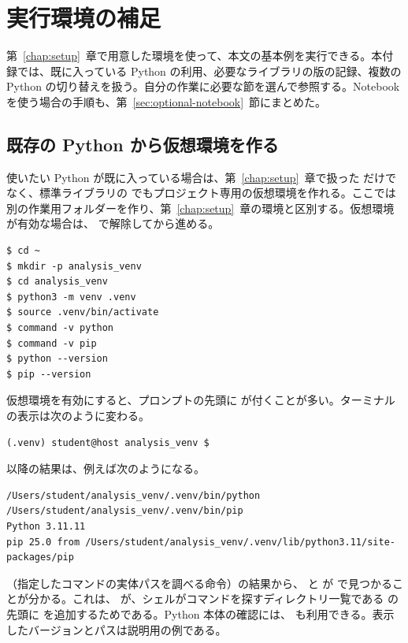 \chapter{実行環境の補足}
\label{app:environment}

第~\ref{chap:setup}~章で用意した環境を使って、本文の基本例を実行できる。本付録では、既に入っている Python の利用、必要なライブラリの版の記録、複数の Python の切り替えを扱う。自分の作業に必要な節を選んで参照する。Notebook を使う場合の手順も、第~\ref{sec:optional-notebook}~節にまとめた。

\section{既存の Python から仮想環境を作る}

使いたい Python が既に入っている場合は、第~\ref{chap:setup}~章で扱った  だけでなく、標準ライブラリの  でもプロジェクト専用の仮想環境を作れる。ここでは別の作業用フォルダーを作り、第~\ref{chap:setup}~章の環境と区別する。仮想環境が有効な場合は、 で解除してから進める。

\begin{lstlisting}[numbers=none, xleftmargin=2\zw]
$ cd ~
$ mkdir -p analysis_venv
$ cd analysis_venv
$ python3 -m venv .venv
$ source .venv/bin/activate
$ command -v python
$ command -v pip
$ python --version
$ pip --version
\end{lstlisting}

仮想環境を有効にすると、プロンプトの先頭に  が付くことが多い。ターミナルの表示は次のように変わる。

\begin{lstlisting}[numbers=none, xleftmargin=2\zw]
(.venv) student@host analysis_venv $
\end{lstlisting}

 以降の結果は、例えば次のようになる。

\begin{lstlisting}[numbers=none, xleftmargin=2\zw]
/Users/student/analysis_venv/.venv/bin/python
/Users/student/analysis_venv/.venv/bin/pip
Python 3.11.11
pip 25.0 from /Users/student/analysis_venv/.venv/lib/python3.11/site-packages/pip
\end{lstlisting}

（指定したコマンドの実体パスを調べる命令）の結果から、 と  が  で見つかることが分かる。これは、 が、シェルがコマンドを探すディレクトリ一覧である  の先頭に  を追加するためである。Python 本体の確認には、 も利用できる。表示したバージョンとパスは説明用の例である。

